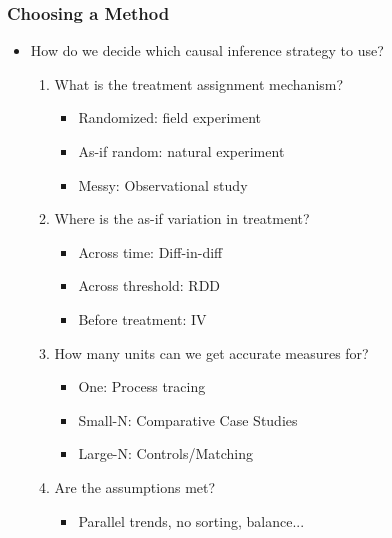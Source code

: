 \documentclass[xcolor=x11names,compress]{beamer}\usepackage[]{graphicx}\usepackage[]{color}
\renewcommand{\(}{\begin{columns}}
\renewcommand{\)}{\end{columns}}
\newcommand{\<}[1]{\begin{column}{#1}}
\renewcommand{\>}{\end{column}}
\begin{document}
\begin{frame}
\frametitle{Choosing a Method}
\begin{itemize}
\item How do we decide which causal inference strategy to use?
\pause
\begin{enumerate}
\item What is the treatment assignment mechanism?
\pause
\begin{itemize}
\item Randomized: field experiment
\item As-if random: natural experiment
\item Messy: Observational study
\end{itemize}
\item Where is the as-if variation in treatment?
\pause
\begin{itemize}
\item Across time: Diff-in-diff
\item Across threshold: RDD
\item Before treatment: IV 
\end{itemize}
\item How many units can we get accurate measures for?
\pause
\begin{itemize}
\item One: Process tracing
\item Small-N: Comparative Case Studies
\item Large-N: Controls/Matching
\end{itemize}
\item Are the assumptions met?
\pause
\begin{itemize}
\item Parallel trends, no sorting, balance...
\end{itemize}
\end{enumerate}
\end{itemize}
\end{frame}
\end{document}
